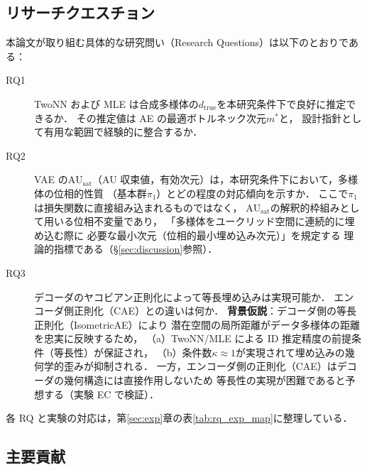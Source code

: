 \documentclass[12pt,a4paper]{jsarticle}
\newcommand{\dzopt}{m^*}                    %
\newcommand{\dtrue}{d_{\mathrm{true}}}
\newcommand{\kap}{\kappa}
\newcommand{\AUsat}{\mathrm{AU}_{\mathrm{sat}}}
\begin{document}
\subsection{リサーチクエスチョン}\label{sec:intro_rq}

本論文が取り組む具体的な研究問い（Research Questions）は以下のとおりである：
\begin{description}
  \item[RQ1] TwoNN および MLE は合成多様体の$\dtrue$を本研究条件下で良好に推定できるか．
             その推定値は AE の最適ボトルネック次元$\dzopt$と，
             設計指針として有用な範囲で経験的に整合するか．
  \item[RQ2] VAE の$\AUsat$（AU 収束値，有効次元）は，本研究条件下において，多様体の位相的性質
             （基本群$\pi_1$）とどの程度の対応傾向を示すか．
             ここで$\pi_1$は損失関数に直接組み込まれるものではなく，
             $\AUsat$の解釈的枠組みとして用いる位相不変量であり，
             「多様体をユークリッド空間に連続的に埋め込む際に
             必要な最小次元（位相的最小埋め込み次元）」を規定する
             理論的指標である（§\ref{sec:discussion}参照）．
  \item[RQ3] デコーダのヤコビアン正則化によって等長埋め込みは実現可能か．
             エンコーダ側正則化（CAE）との違いは何か．
             \textbf{背景仮説}：デコーダ側の等長正則化（IsometricAE）により
             潜在空間の局所距離がデータ多様体の距離を忠実に反映するため，
             （a）TwoNN/MLE による ID 推定精度の前提条件（等長性）が保証され，
             （b）条件数$\kap \approx 1$が実現されて埋め込みの幾何学的歪みが抑制される．
             一方，エンコーダ側の正則化（CAE）はデコーダの幾何構造には直接作用しないため
             等長性の実現が困難であると予想する（実験 EC で検証）．
\end{description}

各 RQ と実験の対応は，第\ref{sec:exp}章の表\ref{tab:rq_exp_map}に整理している．

\subsection{主要貢献}\label{sec:intro_contrib}
\end{document}

